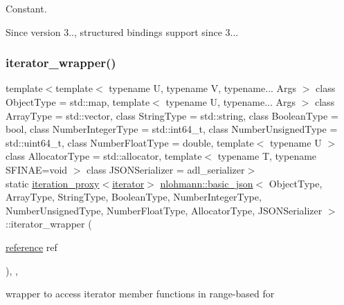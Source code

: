 Constant.

\begin{DoxySince}{Since}
version 3.., structured bindings support since 3... 
\end{DoxySince}
\mbox{\label{classnlohmann_1_1basic__json_a5e4212986136ca1220f351c60e89906b}} 
\subsubsection{\texorpdfstring{iterator\+\_\+wrapper()}{iterator\_wrapper()}\hspace{0.1cm}{\footnotesize\ttfamily [1/2]}}
{\footnotesize\ttfamily template$<$template$<$ typename U, typename V, typename... Args $>$ class Object\+Type = std\+::map, template$<$ typename U, typename... Args $>$ class Array\+Type = std\+::vector, class String\+Type  = std\+::string, class Boolean\+Type  = bool, class Number\+Integer\+Type  = std\+::int64\+\_\+t, class Number\+Unsigned\+Type  = std\+::uint64\+\_\+t, class Number\+Float\+Type  = double, template$<$ typename U $>$ class Allocator\+Type = std\+::allocator, template$<$ typename T, typename S\+F\+I\+N\+A\+E=void $>$ class J\+S\+O\+N\+Serializer = adl\+\_\+serializer$>$ \\
static \mbox{\hyperlink{classnlohmann_1_1detail_1_1iteration__proxy}{iteration\+\_\+proxy}}$<$\mbox{\hyperlink{classnlohmann_1_1basic__json_a099316232c76c034030a38faa6e34dca}{iterator}}$>$ \mbox{\hyperlink{classnlohmann_1_1basic__json}{nlohmann\+::basic\+\_\+json}}$<$ Object\+Type, Array\+Type, String\+Type, Boolean\+Type, Number\+Integer\+Type, Number\+Unsigned\+Type, Number\+Float\+Type, Allocator\+Type, J\+S\+O\+N\+Serializer $>$\+::iterator\+\_\+wrapper (\begin{DoxyParamCaption}\item[{\mbox{\hyperlink{classnlohmann_1_1basic__json_ac6a5eddd156c776ac75ff54cfe54a5bc}{reference}}}]{ref }\end{DoxyParamCaption})\hspace{0.3cm}{\ttfamily [inline]}, {\ttfamily [static]}, {\ttfamily [noexcept]}}



wrapper to access iterator member functions in range-\/based for 

